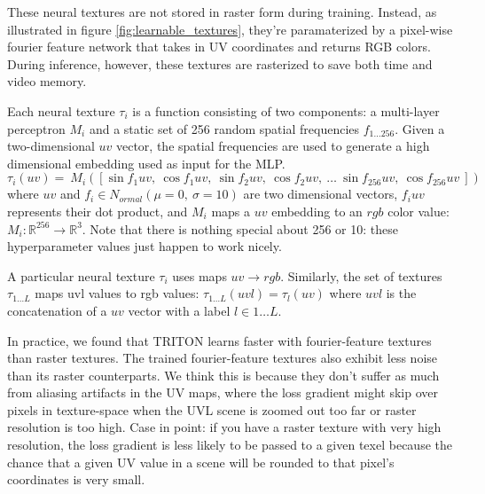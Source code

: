 \documentclass{article}
\begin{document}
	These neural textures are not stored in raster form during training. Instead, as illustrated in figure \ref{fig:learnable_textures}, they're paramaterized by a pixel-wise fourier feature network \cite{fourier_feature_networks} that takes in UV coordinates and returns RGB colors. During inference, however, these textures are rasterized to save both time and video memory.
	
	Each neural texture $\tau_i$ is a function consisting of two components: a multi-layer perceptron $M_i$ and a static set of 256 random spatial frequencies $f_{1...256}$. 
	Given a two-dimensional $uv$ vector, the spatial frequencies are used to generate a high dimensional embedding used as input for the MLP.
	\begin{equation}
			\tau_i(uv) = 
			\
			M_i\left(\left[
				\sin f_1 uv, \ 
				\cos f_1 uv, \ 
				\sin f_2 uv, \ 
				\cos f_2 uv, \ 
				\dots \ 
				\sin f_{256} uv, \ 
				\cos f_{256} uv \ 
			\right]\right)
	\end{equation}
	where $uv$ and $f_i \in N_{ormal}(\mu=0,\ \sigma=10)$ are two dimensional vectors,
	 $f_i uv$ represents their dot product, 
	 and $M_i$ maps a $uv$ embedding to an $rgb$ color value:
	 $M_i: \mathbb{R}^{256} \rightarrow \mathbb{R}^3$.
	Note that there is nothing special about 256 or 10: these hyperparameter values just happen to work nicely.
	
	A particular neural texture $\tau_i$ uses maps $uv \rightarrow rgb$. Similarly, the set of textures $\tau_{1\dots L}$ maps uvl values to rgb values: $\tau_{1\dots L}(uvl)=\tau_l(uv)$ where $uvl$ is the concatenation of a $uv$ vector with a label $l \in 1\dots L$.
	
	In practice, we found that TRITON learns faster with fourier-feature textures than raster textures. The trained fourier-feature textures also exhibit less noise than its raster counterparts. We think this is because they don't suffer as much from aliasing artifacts in the UV maps, where the loss gradient might skip over pixels in texture-space when the UVL scene is zoomed out too far or raster resolution is too high. Case in point: if you have a raster texture with very high resolution, the loss gradient is less likely to be passed to a given texel because the chance that a given UV value in a scene will be rounded to that pixel's coordinates is very small.

\end{document}
